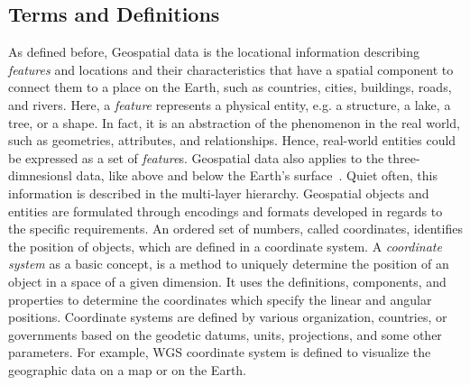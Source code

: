 \documentclass[a4paper,12pt]{article}
\begin{document}
\subsection{Terms and Definitions}
\label{termsanddef}
As defined before, Geospatial data is the locational information describing \textit{features} and locations and their characteristics that have a spatial component to connect them to a place on the Earth, such as countries, cities, buildings, roads, and rivers. Here, a \textit{feature} represents a physical entity, e.g. a structure, a lake, a tree, or a shape. In fact, it is an abstraction of the phenomenon in the real world, such as geometries, attributes, and relationships. Hence, real-world entities could be expressed as a set of \textit{feature}s.
Geospatial data also applies to the three-dimnesionsl data, like above and below the Earth's surface~\cite{powell}. Quiet often, this information is described in the multi-layer hierarchy. Geospatial objects and entities are formulated through encodings and formats developed in regards to the specific requirements. An ordered set of numbers, called coordinates, identifies the position of objects, which are defined in a coordinate system. 
A \emph{coordinate system} as a basic concept, is a method to uniquely determine the position of an object in a space of a given dimension. It uses the definitions, components, and properties to determine the coordinates which specify the linear and angular positions. Coordinate systems are defined by various organization, countries, or governments based on the geodetic datums, units, projections, and some other parameters. For example, WGS coordinate system is defined to visualize the geographic data on a map or on the Earth. 
\end{document}
